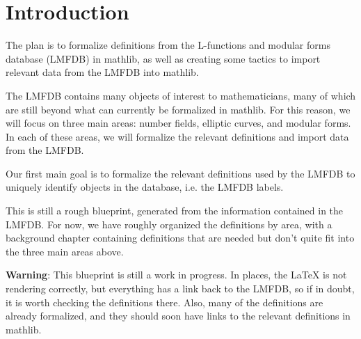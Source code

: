 %

\tableofcontents

\chapter{Introduction}

The plan is to formalize definitions from the L-functions and modular forms database (LMFDB) in mathlib, as well as creating some tactics to import relevant data from the LMFDB into mathlib.

The LMFDB contains many objects of interest to mathematicians, many of which are still beyond what can currently be formalized in mathlib. For this reason, we will focus on three main areas: number fields, elliptic curves, and modular forms. In each of these areas, we will formalize the relevant definitions and import data from the LMFDB.

Our first main goal is to formalize the relevant definitions used by the LMFDB to uniquely identify objects in the database, i.e. the LMFDB labels.

This is still a rough blueprint, generated from the information contained in the LMFDB. For now, we have roughly organized the definitions by area, with a background chapter containing definitions that are needed but don't quite fit into the three main areas above.

\textbf{Warning}: This blueprint is still a work in progress. In places, the LaTeX is not rendering correctly, but everything has a link back to the LMFDB, so if in doubt, it is worth checking the definitions there. Also, many of the definitions are already formalized, and they should soon have links to the relevant definitions in mathlib.






